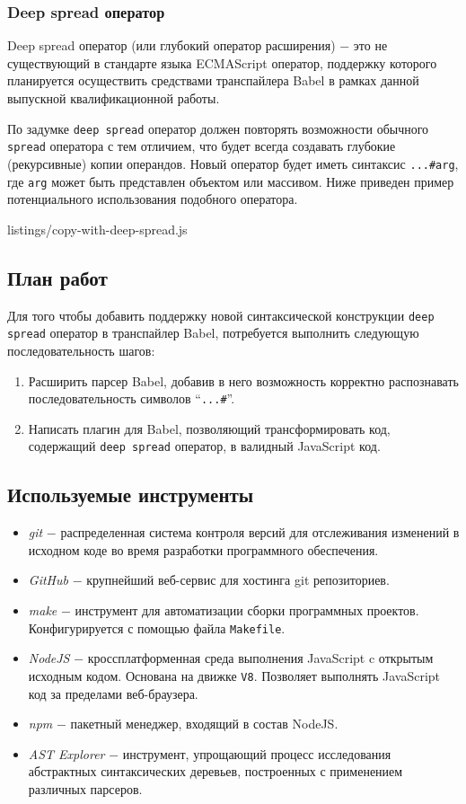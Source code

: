 \documentclass[14pt, a4paper]{article}
\def\code#1{\texttt{#1}} %
\begin{document}
\subsubsection{Deep spread оператор}
Deep spread оператор (или глубокий оператор расширения) $-$ это не существующий в стандарте языка ECMAScript оператор, поддержку которого
планируется осуществить средствами транспайлера Babel в рамках данной выпускной квалификационной работы.

По задумке \code{deep spread} оператор должен повторять возможности обычного \code{spread} оператора с тем отличием,
что будет всегда создавать глубокие (рекурсивные) копии операндов. Новый оператор будет иметь синтаксис \code{...\#arg},
где \code{arg} может быть представлен объектом или массивом. Ниже приведен пример потенциального
использования подобного оператора.

{listings/copy-with-deep-spread.js}

\subsection{План работ}
Для того чтобы добавить поддержку новой синтаксической конструкции \code{deep spread} оператор в
транспайлер Babel, потребуется выполнить следующую последовательность шагов:
\begin{enumerate}
  \item Расширить парсер Babel, добавив в него возможность корректно распознавать последовательность символов
        ``\code{...\#}''.
  \item Написать плагин для Babel, позволяющий трансформировать код, содержащий \code{deep spread} оператор,
        в валидный JavaScript код.

\end{enumerate}

\subsection{Используемые инструменты}
\begin{itemize}
  \item \textit{git} $-$ распределенная система контроля версий для отслеживания изменений в исходном коде
        во время разработки программного обеспечения.
  \item \textit{GitHub} $-$ крупнейший веб-сервис для хостинга git репозиториев.
  \item \textit{make} $-$ инструмент для автоматизации сборки программных проектов. Конфигурируется с помощью файла
        \code{Makefile}.
  \item \textit{NodeJS} $-$ кроссплатформенная среда выполнения JavaScript c открытым исходным кодом.
        Основана на движке \code{V8}. Позволяет выполнять JavaScript код за пределами веб-браузера.
  \item \textit{npm} $-$ пакетный менеджер, входящий в состав NodeJS.
  \item \textit{AST Explorer} $-$ инструмент, упрощающий процесс исследования абстрактных
        синтаксических деревьев, построенных с применением различных парсеров.
\end{itemize}
\end{document}
